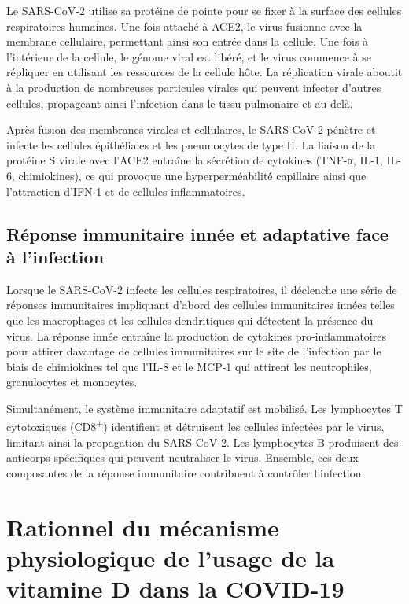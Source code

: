 \documentclass[
  a4paper,
  DIV=11,
  numbers=noendperiod,
  listof=totoc]{scrreprt}
\begin{document}
Le \ac{SARS-CoV-2} utilise sa protéine de pointe pour se fixer à la
surface des cellules respiratoires humaines. Une fois attaché à
\ac{ACE2}, le virus fusionne avec la membrane cellulaire, permettant
ainsi son entrée dans la cellule. Une fois à l'intérieur de la cellule,
le génome viral est libéré, et le virus commence à se répliquer en
utilisant les ressources de la cellule hôte. La réplication virale
aboutit à la production de nombreuses particules virales qui peuvent
infecter d'autres cellules, propageant ainsi l'infection dans le tissu
pulmonaire et au-delà.

Après fusion des membranes virales et cellulaires, le SARS-CoV-2 pénètre
et infecte les cellules épithéliales et les pneumocytes de type II. La
liaison de la protéine S virale avec l'\ac{ACE2} entraîne la sécrétion
de cytokines (TNF-α, IL-1, IL-6, chimiokines), ce qui provoque une
hyperperméabilité́ capillaire ainsi que l'attraction d'\ac{IFN-1} et de
cellules inflammatoires.

\subsection{Réponse immunitaire innée et adaptative face à
l'infection}\label{ruxe9ponse-immunitaire-innuxe9e-et-adaptative-face-uxe0-linfection}

Lorsque le SARS-CoV-2 infecte les cellules respiratoires, il déclenche
une série de réponses immunitaires impliquant d'abord des cellules
immunitaires innées telles que les macrophages et les cellules
dendritiques qui détectent la présence du virus. La réponse innée
entraîne la production de cytokines pro-inflammatoires pour attirer
davantage de cellules immunitaires sur le site de l'infection par le
biais de chimiokines tel que l'\ac{IL-8} et le MCP-1 qui attirent les
neutrophiles, granulocytes et monocytes.

Simultanément, le système immunitaire adaptatif est mobilisé. Les
lymphocytes T cytotoxiques (CD8\textsuperscript{+}) identifient et
détruisent les cellules infectées par le virus, limitant ainsi la
propagation du \ac{SARS-CoV-2}. Les lymphocytes B produisent des
anticorps spécifiques qui peuvent neutraliser le virus. Ensemble, ces
deux composantes de la réponse immunitaire contribuent à contrôler
l'infection.

\section{Rationnel du mécanisme physiologique de l'usage de la vitamine
D dans la
COVID-19}\label{rationnel-du-muxe9canisme-physiologique-de-lusage-de-la-vitamine-d-dans-la-covid-19}
\end{document}
